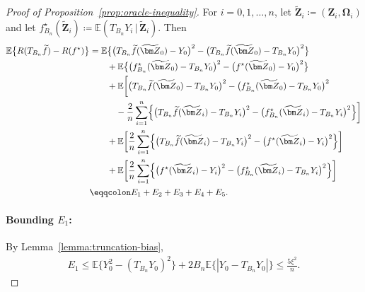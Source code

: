 \documentclass[12pt]{article}
\def\tilde{\widetilde}
\begin{document}
\begin{proof}[Proof of Proposition~\ref{prop:oracle-inequality}]
    For $i=0,1,\ldots,n$, let $\tilde{\bm Z}_i \coloneqq (\bm Z_i,\bm \Omega_i)$ and let $f^{\star}_{B_n}(\tilde{\bm Z}_i) \coloneqq \mathbb{E}(T_{B_n}Y_i \,|\, \tilde{\bm Z}_i)$. Then
    \begin{align*}
        \mathbb{E}\bigl\{ R(T_{B_n}\tilde{f}) - R(f^{\star}) \bigr\} &= \mathbb{E}\bigl\{ \bigl(T_{B_n}\tilde{f}(\tilde{\bm Z}_0) - Y_0\bigr)^2 - \bigl(T_{B_n}\tilde{f}(\tilde{\bm Z}_0) - T_{B_n}Y_0\bigr)^2 \bigr\}\\
        &\qquad + \mathbb{E}\bigl\{ \bigl(f^{\star}_{B_n}(\tilde{\bm Z}_0) - T_{B_n}Y_0\bigr)^2 - \bigl(f^{\star}(\tilde{\bm Z}_0) - Y_0\bigr)^2 \bigr\}\\
        &\qquad + \mathbb{E}\biggl[ \bigl(T_{B_n}\tilde{f}(\tilde{\bm Z}_0) - T_{B_n}Y_0\bigr)^2 - \bigl(f^{\star}_{B_n}(\tilde{\bm Z}_0) - T_{B_n}Y_0\bigr)^2\\
        &\qquad\quad -\frac{2}{n} \sum_{i=1}^n \Bigl\{ \bigl(T_{B_n}\tilde{f}(\tilde{\bm Z}_i) - T_{B_n}Y_i\bigr)^2 - \bigl(f^{\star}_{B_n}(\tilde{\bm Z}_i) - T_{B_n}Y_i\bigr)^2 \Bigr\}\biggr] \\
        &\qquad + \mathbb{E}\biggl[ \frac{2}{n} \sum_{i=1}^n \Bigl\{ \bigl(T_{B_n}\tilde{f}(\tilde{\bm Z}_i) - T_{B_n}Y_i\bigr)^2 - \bigl(f^{\star}(\tilde{\bm Z}_i) - Y_i\bigr)^2 \Bigr\} \biggr] \\
        &\qquad + \mathbb{E}\biggl[ \frac{2}{n} \sum_{i=1}^n \Bigl\{\bigl(f^{\star}(\tilde{\bm Z}_i) - Y_i\bigr)^2 - \bigl(f^{\star}_{B_n}(\tilde{\bm Z}_i) - T_{B_n}Y_i\bigr)^2\Bigr\} \biggr]\\
        &\eqqcolon E_1 + E_2 + E_3 + E_4 + E_5.
    \end{align*}

    \paragraph{Bounding $E_1$:} By Lemma~\ref{lemma:truncation-bias},
    \begin{align}
        E_1 \leq \mathbb{E}\bigl\{ Y_0^2 - (T_{B_n}Y_0)^2 \bigr\} + 2B_n\mathbb{E}\bigl\{ |Y_0 - T_{B_n}Y_0| \bigr\} \leq \frac{5\xi^2}{n}. \label{eq:oracle-inequality-E1}
    \end{align}


\end{proof}
\end{document}
